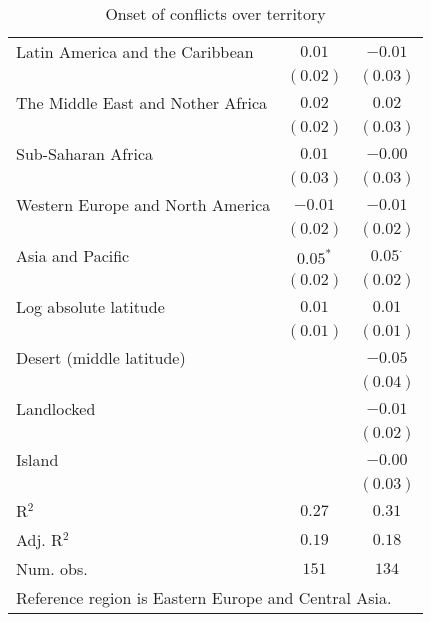 \begin{table}[H]
\begin{center}
{\begin{tabular}{l c c}
Latin America and the Caribbean   & $0.01$      & $-0.01$        \\
                                  & $(0.02)$    & $(0.03)$       \\
The Middle East and Nother Africa & $0.02$      & $0.02$         \\
                                  & $(0.02)$    & $(0.03)$       \\
Sub-Saharan Africa                & $0.01$      & $-0.00$        \\
                                  & $(0.03)$    & $(0.03)$       \\
Western Europe and North America  & $-0.01$     & $-0.01$        \\
                                  & $(0.02)$    & $(0.02)$       \\
Asia and Pacific                  & $0.05^{*}$  & $0.05^{\cdot}$ \\
                                  & $(0.02)$    & $(0.02)$       \\
Log absolute latitude             & $0.01$      & $0.01$         \\
                                  & $(0.01)$    & $(0.01)$       \\
Desert (middle latitude)          &             & $-0.05$        \\
                                  &             & $(0.04)$       \\
Landlocked                        &             & $-0.01$        \\
                                  &             & $(0.02)$       \\
Island                            &             & $-0.00$        \\
                                  &             & $(0.03)$       \\
\hline
R$^2$                             & $0.27$      & $0.31$         \\
Adj. R$^2$                        & $0.19$      & $0.18$         \\
Num. obs.                         & $151$       & $134$          \\
\hline
\multicolumn{3}{l}{\scriptsize{Reference region is Eastern Europe and Central Asia.}}
\end{tabular}
}
\caption{Onset of conflicts over territory}
\label{onsetterr}
\end{center}
\end{table}
